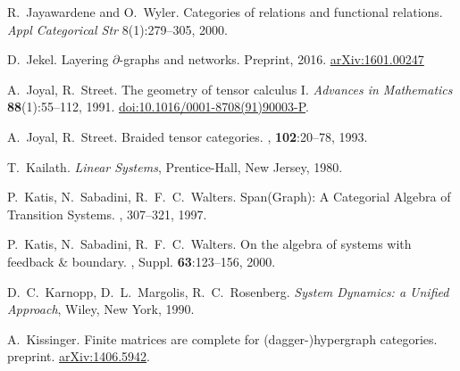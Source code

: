 \begin{thebibliography}{RSW00}
    R.\ Jayawardene and O.\ Wyler.
    \newblock Categories of relations and functional relations.
    \newblock \emph{Appl Categorical Str} 8(1):279--305, 2000.
    
    D.\ Jekel.
    \newblock Layering $\partial$-graphs and networks. 
    \newblock Preprint, 2016.
    \newblock \href{http://arxiv.org/abs/1601.00247}{arXiv:1601.00247}

    A.\ Joyal, R.\ Street.
    \newblock The geometry of tensor calculus I.
    \newblock \emph{Advances in Mathematics} {\bf 88}(1):55--112, 1991.
    \newblock \href{http://doi.org/10.1016/0001-8708(91)90003-P}{doi:10.1016/0001-8708(91)90003-P}.

    A.\ Joyal, R.\ Street.
    \newblock Braided tensor categories.
    , {\bf 102}:20--78, 1993.

    T.\ Kailath.
    \newblock \emph{Linear Systems}, Prentice-Hall, New Jersey, 1980.

    P.\ Katis, N.\ Sabadini, R.\ F.\ C.\ Walters.
    \newblock Span(Graph): A Categorial Algebra of Transition Systems.
    , 307--321, 1997. 

    P.\ Katis, N.\ Sabadini, R.\ F.\ C.\ Walters.
    \newblock On the algebra of systems with feedback \& boundary.
    ,
    Suppl. {\bf 63}:123--156, 2000.



    D.\ C.\ Karnopp, D.\ L.\ Margolis, R.\ C.\ Rosenberg.
    \newblock \textsl{System Dynamics: a Unified Approach}, Wiley, New York, 1990.

    A.\ Kissinger.
    \newblock Finite matrices are complete for (dagger-)hypergraph categories.
    \newblock preprint.
    \newblock \href{http://arxiv.org/abs/1406.5942}{arXiv:1406.5942}.


\end{thebibliography}
